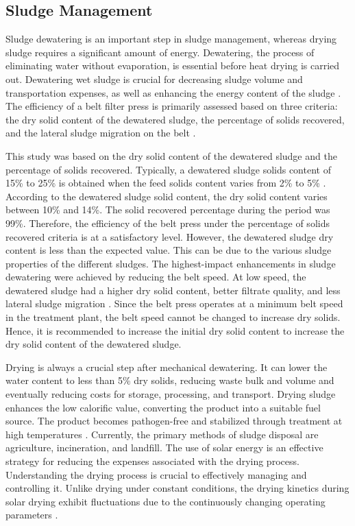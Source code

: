 \newpage
\subsection{Sludge Management}
Sludge dewatering is an important step in sludge management, whereas drying sludge requires a significant amount of energy. Dewatering, the process of eliminating water without evaporation, is essential before heat drying is carried out. Dewatering wet sludge is crucial for decreasing sludge volume and transportation expenses, as well as enhancing the energy content of the sludge \cite{Chen2002}. The efficiency of a belt filter press is primarily assessed based on three criteria: the dry solid content of the dewatered sludge, the percentage of solids recovered, and the lateral sludge migration on the belt \cite{Olivier2005}. 

This study was based on the dry solid content of the dewatered sludge and the percentage of solids recovered. Typically, a dewatered sludge solids content of 15\% to 25\% is obtained when the feed solids content varies from 2\% to 5\% \cite{Mamais2009}. According to the dewatered sludge solid content, the dry solid content varies between 10\% and 14\%.  The solid recovered percentage during the period was 99\%. Therefore, the efficiency of the belt press under the percentage of solids recovered criteria is at a satisfactory level. However, the dewatered sludge dry content is less than the expected value. This can be due to the various sludge properties of the different sludges. The highest-impact enhancements in sludge dewatering were achieved by reducing the belt speed. At low speed, the dewatered sludge had a higher dry solid content, better filtrate quality, and less lateral sludge migration \cite{Olivier2005}. Since the belt press operates at a minimum belt speed in the treatment plant, the belt speed cannot be changed to increase dry solids. Hence, it is recommended to increase the initial dry solid content to increase the dry solid content of the dewatered sludge.

Drying is always a crucial step after mechanical dewatering. It can lower the water content to less than 5\% dry solids, reducing waste bulk and volume and eventually reducing costs for storage, processing, and transport. Drying sludge enhances the low calorific value, converting the product into a suitable fuel source. The product becomes pathogen-free and stabilized through treatment at high temperatures \cite{Leonard2008, Bennamoun2012}. Currently, the primary methods of sludge disposal are agriculture, incineration, and landfill. The use of solar energy is an effective strategy for reducing the expenses associated with the drying process. Understanding the drying process is crucial to effectively managing and controlling it. Unlike drying under constant conditions, the drying kinetics during solar drying exhibit fluctuations due to the continuously changing operating parameters \cite{Bennamoun2012}.

